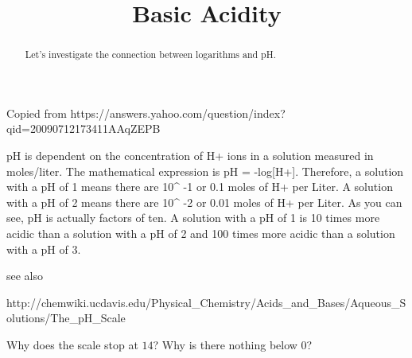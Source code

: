 \documentclass{ximera}
\title{Basic Acidity}
\begin{document}
\begin{abstract}
Let's investigate the connection between logarithms and pH.
\end{abstract}
\maketitle

Copied from https://answers.yahoo.com/question/index?qid=20090712173411AAqZEPB

pH is dependent on the concentration of H+ ions in a solution measured in moles/liter. The mathematical expression is pH = -log[H+]. Therefore, a solution with a pH of 1 means there are 10^ -1 or 0.1 moles of H+ per Liter. A solution with a pH of 2 means there are 10^ -2 or 0.01 moles of H+ per Liter. As you can see, pH is actually factors of ten. A solution with a pH of 1 is 10 times more acidic than a solution with a pH of 2 and 100 times more acidic than a solution with a pH of 3.

see also 

http://chemwiki.ucdavis.edu/Physical_Chemistry/Acids_and_Bases/Aqueous_Solutions/The_pH_Scale

\begin{question}
Why does the scale stop at $14$? Why is there nothing below $0$?
\end{question}
\end{document}

